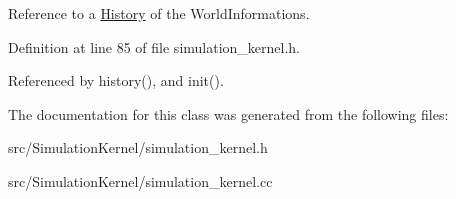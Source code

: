 Reference to a \hyperlink{class_history}{History} of the WorldInformations. 

Definition at line 85 of file simulation\_\-kernel.h.

Referenced by history(), and init().

The documentation for this class was generated from the following files:\begin{CompactItemize}
\item 
src/SimulationKernel/simulation\_\-kernel.h\item 
src/SimulationKernel/simulation\_\-kernel.cc\end{CompactItemize}
